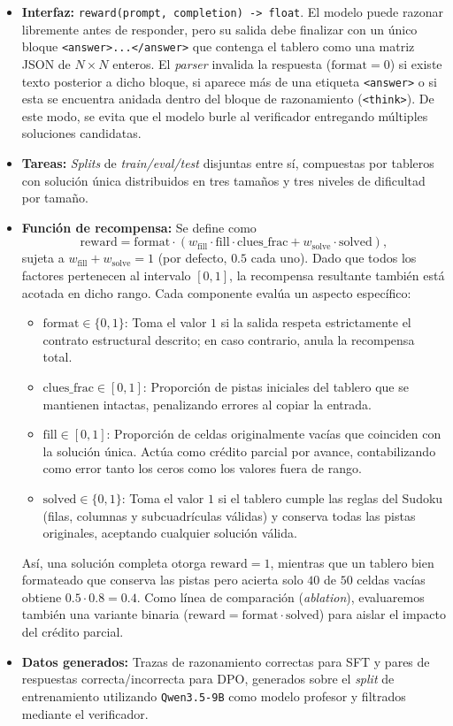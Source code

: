 \documentclass[letterpaper,11pt]{article}
\begin{document}
\begin{itemize}
  \item \textbf{Interfaz:} \texttt{reward(prompt, completion) -> float}. El modelo puede razonar libremente antes de responder, pero su salida debe finalizar con un único bloque \texttt{<answer>...</answer>} que contenga el tablero como una matriz JSON de $N\times N$ enteros. El \emph{parser} invalida la respuesta ($\text{format}=0$) si existe texto posterior a dicho bloque, si aparece más de una etiqueta \texttt{<answer>} o si esta se encuentra anidada dentro del bloque de razonamiento (\texttt{<think>}). De este modo, se evita que el modelo burle al verificador entregando múltiples soluciones candidatas.

  \item \textbf{Tareas:} \emph{Splits} de \emph{train/eval/test} disjuntas entre sí, compuestas por tableros con solución única distribuidos en tres tamaños y tres niveles de dificultad por tamaño.

  \item \textbf{Función de recompensa:} Se define como 
  \[
    \text{reward} = \text{format} \cdot (w_{\text{fill}} \cdot \text{fill} \cdot \text{clues\_frac} + w_{\text{solve}} \cdot \text{solved}),
  \]
  sujeta a $w_{\text{fill}} + w_{\text{solve}} = 1$ (por defecto, $0.5$ cada uno). Dado que todos los factores pertenecen al intervalo $[0,1]$, la recompensa resultante también está acotada en dicho rango. Cada componente evalúa un aspecto específico:
  \begin{itemize}
    \item $\text{format} \in \{0,1\}$: Toma el valor $1$ si la salida respeta estrictamente el contrato estructural descrito; en caso contrario, anula la recompensa total.
    \item $\text{clues\_frac} \in [0,1]$: Proporción de pistas iniciales del tablero que se mantienen intactas, penalizando errores al copiar la entrada.
    \item $\text{fill} \in [0,1]$: Proporción de celdas originalmente vacías que coinciden con la solución única. Actúa como crédito parcial por avance, contabilizando como error tanto los ceros como los valores fuera de rango.
    \item $\text{solved} \in \{0,1\}$: Toma el valor $1$ si el tablero cumple las reglas del Sudoku (filas, columnas y subcuadrículas válidas) y conserva todas las pistas originales, aceptando cualquier solución válida.
  \end{itemize}
  Así, una solución completa otorga $\text{reward}=1$, mientras que un tablero bien formateado que conserva las pistas pero acierta solo $40$ de $50$ celdas vacías obtiene $0.5 \cdot 0.8 = 0.4$. Como línea de comparación (\emph{ablation}), evaluaremos también una variante binaria ($\text{reward} = \text{format} \cdot \text{solved}$) para aislar el impacto del crédito parcial.

  \item \textbf{Datos generados:} Trazas de razonamiento correctas para SFT y pares de respuestas correcta/incorrecta para DPO, generados sobre el \emph{split} de entrenamiento utilizando \texttt{Qwen3.5-9B} como modelo profesor y filtrados mediante el verificador.
\end{itemize}
\end{document}
